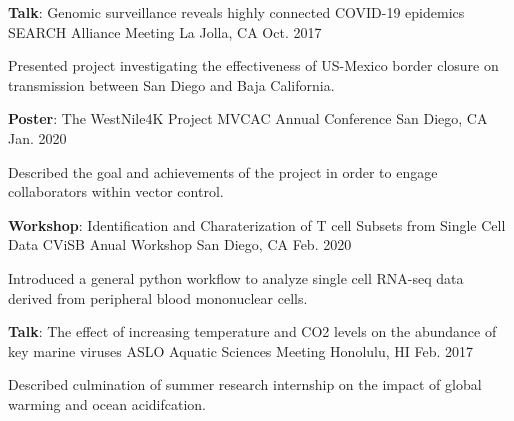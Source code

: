 \begin{cventries}
    \cventry
    {\textbf{Talk}: Genomic surveillance reveals highly connected COVID-19 epidemics} %
    {SEARCH Alliance Meeting} %
    {La Jolla, CA} %
    {Oct. 2017} %
    {
      \begin{cvitems} %
        \item{Presented project investigating the effectiveness of US-Mexico border closure on transmission between San Diego and Baja California.}
      \end{cvitems}
    }
    
  \cventry
    {\textbf{Poster}: The WestNile4K Project} %
    {MVCAC Annual Conference} %
    {San Diego, CA} %
    {Jan. 2020} %
    {
      \begin{cvitems} %
        \item {Described the goal and achievements of the project in order to engage collaborators within vector control.}
      \end{cvitems}
    }

  \cventry
    {\textbf{Workshop}: Identification and Charaterization of T cell Subsets from Single Cell Data} %
    {CViSB Anual Workshop} %
    {San Diego, CA} %
    {Feb. 2020} %
    {
      \begin{cvitems} %
        \item {Introduced a general python workflow to analyze single cell RNA-seq data derived from peripheral blood mononuclear cells.}
      \end{cvitems}
    }

  \cventry
    {\textbf{Talk}: The effect of increasing temperature and CO2 levels on the abundance of key marine viruses} %
    {ASLO Aquatic Sciences Meeting} %
    {Honolulu, HI} %
    {Feb. 2017} %
    {
      \begin{cvitems} %
        \item {Described culmination of summer research internship on the impact of global warming and ocean acidifcation.}
      \end{cvitems}
    }

\end{cventries}
